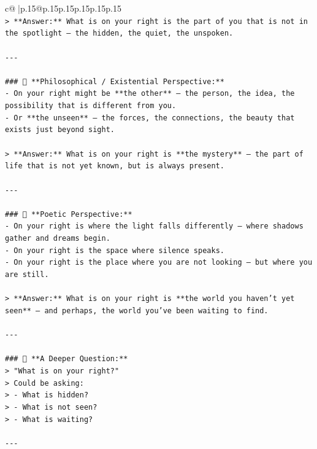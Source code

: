 \documentclass{article}
\begin{document}
{\begin{supertabular}{c@{$\;$}|p{.15\linewidth}@{}p{.15\linewidth}p{.15\linewidth}p{.15\linewidth}p{.15\linewidth}p{.15\linewidth}}
{{{\\ 
\texttt{> **Answer:** What is on your right is the part of you that is not in the spotlight — the hidden, the quiet, the unspoken.} \\
\\ 
\texttt{{-}{-}{-}} \\
\\ 
\texttt{\#\#\# 🌌 **Philosophical / Existential Perspective:**} \\
\texttt{{-} On your right might be **the other** — the person, the idea, the possibility that is different from you.} \\
\texttt{{-} Or **the unseen** — the forces, the connections, the beauty that exists just beyond sight.} \\
\\ 
\texttt{> **Answer:** What is on your right is **the mystery** — the part of life that is not yet known, but is always present.} \\
\\ 
\texttt{{-}{-}{-}} \\
\\ 
\texttt{\#\#\# 🎨 **Poetic Perspective:**} \\
\texttt{{-} On your right is where the light falls differently — where shadows gather and dreams begin.} \\
\texttt{{-} On your right is the space where silence speaks.} \\
\texttt{{-} On your right is the place where you are not looking — but where you are still.} \\
\\ 
\texttt{> **Answer:** What is on your right is **the world you haven’t yet seen** — and perhaps, the world you’ve been waiting to find.} \\
\\ 
\texttt{{-}{-}{-}} \\
\\ 
\texttt{\#\#\# 🤔 **A Deeper Question:**} \\
\texttt{> "What is on your right?"  } \\
\texttt{> Could be asking:  } \\
\texttt{> {-} What is hidden?  } \\
\texttt{> {-} What is not seen?  } \\
\texttt{> {-} What is waiting?} \\
\\ 
\texttt{{-}{-}{-}} \\
\\ 
}}}
\end{supertabular}}
\end{document}
